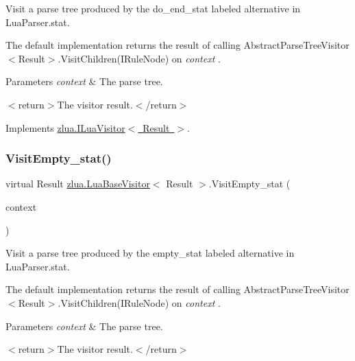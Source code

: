 Visit a parse tree produced by the {\ttfamily do\+\_\+end\+\_\+stat} labeled alternative in Lua\+Parser.\+stat. 

The default implementation returns the result of calling Abstract\+Parse\+Tree\+Visitor$<$\+Result$>$.\+Visit\+Children(\+I\+Rule\+Node) on {\itshape context} . 


\begin{DoxyParams}{Parameters}
{\em context} & The parse tree.\\
\hline
\end{DoxyParams}
$<$return$>$The visitor result.$<$/return$>$ 

Implements \mbox{\hyperlink{interfacezlua_1_1_i_lua_visitor_a0bffd1ec59b6a27546f19006974cd6c1}{zlua.\+I\+Lua\+Visitor$<$ Result $>$}}.

\mbox{\label{classzlua_1_1_lua_base_visitor_af23710bf29c64a2976a48e6de8cae004}} 
\subsubsection{\texorpdfstring{Visit\+Empty\+\_\+stat()}{VisitEmpty\_stat()}}
{\footnotesize\ttfamily virtual Result \mbox{\hyperlink{classzlua_1_1_lua_base_visitor}{zlua.\+Lua\+Base\+Visitor}}$<$ Result $>$.Visit\+Empty\+\_\+stat (\begin{DoxyParamCaption}\item[{\mbox{[}\+Not\+Null\mbox{]} \mbox{\hyperlink{classzlua_1_1_lua_parser_1_1_empty__stat_context}{Lua\+Parser.\+Empty\+\_\+stat\+Context}}}]{context }\end{DoxyParamCaption})\hspace{0.3cm}{\ttfamily [virtual]}}



Visit a parse tree produced by the {\ttfamily empty\+\_\+stat} labeled alternative in Lua\+Parser.\+stat. 

The default implementation returns the result of calling Abstract\+Parse\+Tree\+Visitor$<$\+Result$>$.\+Visit\+Children(\+I\+Rule\+Node) on {\itshape context} . 


\begin{DoxyParams}{Parameters}
{\em context} & The parse tree.\\
\hline
\end{DoxyParams}
$<$return$>$The visitor result.$<$/return$>$ 

